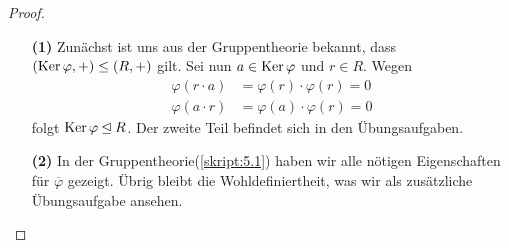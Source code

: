 \begin{proof} \
	\begin{enumerate}
		\item[\textbf{(1)}]
		Zunächst ist uns aus der Gruppentheorie bekannt, dass $(\operatorname{Ker} \varphi, + ) \leq (R,+)$ gilt.
		Sei nun $a \in \operatorname{Ker} \varphi$ und $r \in R$. Wegen
		\begin{align*}
		\varphi(r \cdot a) &= \varphi(r) \cdot \varphi(r) = 0 \\
		\varphi(a \cdot r) &= \varphi(a) \cdot \varphi(r) = 0
		\end{align*}
		folgt $\operatorname{Ker} \varphi \unlhd R$.
		Der zweite Teil befindet sich in den Übungsaufgaben.
		
		\item[\textbf{(2)}]
		In der Gruppentheorie(\ref{skript:5.1}) haben wir alle nötigen Eigenschaften für $\overline{\varphi}$ gezeigt.
		Übrig bleibt die Wohldefiniertheit, was wir als zusätzliche Übungsaufgabe ansehen.
	\end{enumerate}
\end{proof}

